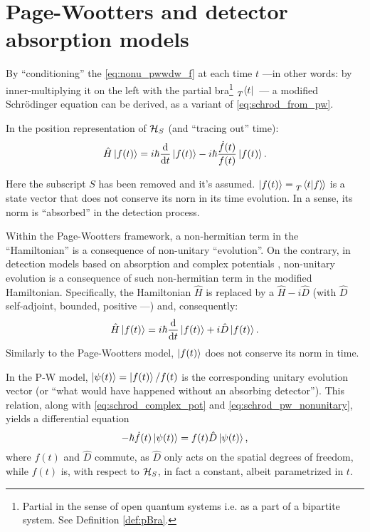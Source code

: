 \section{Page-Wootters and detector absorption models}\label{sec:absorption+pw}

By ``conditioning'' the \eqref{eq:nonu_pwwdw_f} at each time $t$
---in other words: by inner-multiplying it on the left with the partial bra\footnote{
  Partial in the sense of open quantum systems
  i.e. as a part of a bipartite system.
  See Definition \ref{def:pBra}.
}
$\prescript{}{T}{\bra{t}}$~---
a modified Schr{\"o}dinger equation
can be derived,
as a variant of \eqref{eq:schrod_from_pw}.

In the position representation of $\mathcal{H}_S$ (and ``tracing out'' time):
\begin{equation}\label{eq:schrod_pw_nonunitary}
  \hat{H} \ket{f(t)} = i\hbar\dv{t}\ket{f(t)} -i\hbar\frac{\dot{f}(t)}{f(t)}\ket{f(t)} \text{.}
\end{equation}

Here the subscript $S$ has been removed and it's assumed.
$\ket{f(t)} = \prescript{}{T}{\left.\left\langle t \middle| f \right\rangle\hspace{-0.115em}\right\rangle}$
is a state vector that does not conserve its norn in its time evolution.
In a sense, its norm is ``absorbed'' in the detection process.

Within the Page-Wootters framework, a non-hermitian term in the ``Hamiltonian''
is a consequence of non-unitary ``evolution''.
On the contrary, in detection models based on absorption and complex potentials
\parencite{RuschhauptAbsorption}, non-unitary evolution is a consequence
of such non-hermitian term in the modified Hamiltonian.
Specifically, the Hamiltonian $\hat{H}$ is replaced by a $\hat{H} - i\hat{D}$
(with $\hat{D}$ self-adjoint, bounded, positive ---\cite{RuschhauptAbsorption})
and, consequently:
\begin{equation}\label{eq:schrod_complex_pot}
  \hat{H} \ket{f(t)} = i\hbar\dv{t}\ket{f(t)} +i\hat{D}\ket{f(t)} \text{.}
\end{equation}
Similarly to the Page-Wootters model, $\ket{f(t)}$ does not conserve its norm in time.

In the P-W model, $\ket{\psi(t)} = \ket{f(t)}/f(t)$
is the corresponding unitary evolution vector
(or ``what would have happened without an absorbing detector'').
This relation, along with \eqref{eq:schrod_complex_pot} and \eqref{eq:schrod_pw_nonunitary},
yields a differential equation
\begin{equation}\label{eq:phi_diffeq}
  -\hbar\dot{f}(t)\ket{\psi(t)} = f(t) \hat{D} \ket{\psi(t)} \text{,}
\end{equation}
where $f(t)$ and $\hat{D}$ commute, as $\hat{D}$ only acts on the spatial degrees of freedom,
while $f(t)$ is, with respect to $\mathcal{H}_S$, in fact a constant, albeit parametrized in $t$.

